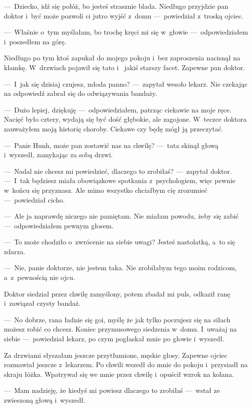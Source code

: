 ---~Dziecko, idź się połóż, bo jesteś strasznie blada. Niedługo przyjdzie pan doktor i~być może pozwoli ci jutro 
wyjść z~domu ---~powiedział z~troską ojciec.

---~Właśnie o~tym myślałam, bo trochę kręci mi się w~głowie ---~odpowiedziałem i~poszedłem na górę. 

Niedługo po tym ktoś zapukał do mojego pokoju i~bez zaproszenia nacisnął na klamkę. W~drzwiach pojawił się tato i~
jakiś starszy facet. Zapewne pan doktor. 

---~I~jak się dzisiaj czujesz, młoda panno? ---~zapytał wesoło lekarz. Nie czekając na odpowiedź zabrał się do 
odwiązywania bandaży.

---~Dużo lepiej, dziękuję ---~odpowiedziałem, patrząc ciekawie na moje ręce. Nacięć było cztery, wydają się być dość 
głębokie, ale zagojone. W~teczce doktora zauważyłem moją historię choroby. Ciekawe czy będę mógł ją przeczytać. 

---~Panie Hunh, może pan zostawić nas na chwilę? ---~tata skinął głową i~wyszedł, zamykając za sobą drzwi.

---~Nadal nie chcesz mi powiedzieć, dlaczego to zrobiłaś? ---~zapytał doktor. ---~I~tak będziesz miała obowiązkowe 
spotkania z~psychologiem, więc pewnie w~końcu się przyznasz. Ale mimo wszystko chciałbym cię zrozumieć ---~powiedział 
cicho.

---~Ale ja naprawdę niczego nie pamiętam. Nie miałam powodu, żeby się zabić ---~odpowiedziałem pewnym głosem.

---~To może chodziło o~zwrócenie na siebie uwagi? Jesteś nastolatką, a~to się zdarza.

---~Nie, panie doktorze, nie jestem taka. Nie zrobiłabym tego moim rodzicom, a~z~pewnością nie ojcu.

Doktor siedział przez chwilę zamyślony, potem zbadał mi puls, odkaził ranę i~zawiązał czysty bandaż.

---~No dobrze, rana ładnie się goi, myślę że jak tylko poczujesz się na siłach możesz robić co chcesz. Koniec 
przymusowego siedzenia w~domu. I~uważaj na siebie ---~powiedział lekarz, po czym pogłaskał mnie po głowie i~wyszedł. 

Za drzwiami słyszałam jeszcze przytłumione, męskie głosy. Zapewne ojciec rozmawiał jeszcze z~lekarzem. Po chwili 
wszedł do mnie do pokoju i~przysiadł na skraju łóżka. Wpatrywał się we mnie przez chwilę i~opuścił wzrok na kolana.

---~Mam nadzieję, że kiedyś mi powiesz dlaczego to zrobiłaś ---~wstał ze zwieszoną głową i~wyszedł.

